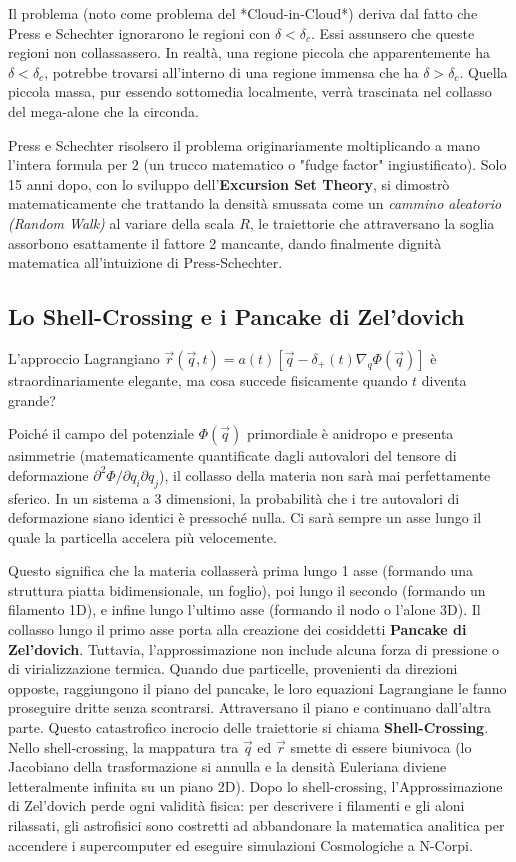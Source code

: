 \documentclass[11pt,a4paper]{report}
\begin{document}
Il problema (noto come problema del *Cloud-in-Cloud*) deriva dal fatto che Press e Schechter ignorarono le regioni con $\delta < \delta_c$. Essi assunsero che queste regioni non collassassero. In realtà, una regione piccola che apparentemente ha $\delta < \delta_c$, potrebbe trovarsi all'interno di una regione immensa che ha $\delta > \delta_c$. Quella piccola massa, pur essendo sottomedia localmente, verrà trascinata nel collasso del mega-alone che la circonda. 

Press e Schechter risolsero il problema originariamente moltiplicando a mano l'intera formula per $2$ (un trucco matematico o "fudge factor" ingiustificato). Solo 15 anni dopo, con lo sviluppo dell'\textbf{Excursion Set Theory}, si dimostrò matematicamente che trattando la densità smussata come un \textit{cammino aleatorio (Random Walk)} al variare della scala $R$, le traiettorie che attraversano la soglia assorbono esattamente il fattore 2 mancante, dando finalmente dignità matematica all'intuizione di Press-Schechter.

\subsection{Lo Shell-Crossing e i Pancake di Zel'dovich}
L'approccio Lagrangiano $\vec{r}(\vec{q}, t) = a(t) [ \vec{q} - \delta_+(t) \nabla_q \Phi(\vec{q}) ]$ è straordinariamente elegante, ma cosa succede fisicamente quando $t$ diventa grande?

Poiché il campo del potenziale $\Phi(\vec{q})$ primordiale è anidropo e presenta asimmetrie (matematicamente quantificate dagli autovalori del tensore di deformazione $\partial^2 \Phi / \partial q_i \partial q_j$), il collasso della materia non sarà mai perfettamente sferico. 
In un sistema a 3 dimensioni, la probabilità che i tre autovalori di deformazione siano identici è pressoché nulla. Ci sarà sempre un asse lungo il quale la particella accelera più velocemente.

Questo significa che la materia collasserà prima lungo 1 asse (formando una struttura piatta bidimensionale, un foglio), poi lungo il secondo (formando un filamento 1D), e infine lungo l'ultimo asse (formando il nodo o l'alone 3D).
Il collasso lungo il primo asse porta alla creazione dei cosiddetti \textbf{Pancake di Zel'dovich}. 
Tuttavia, l'approssimazione non include alcuna forza di pressione o di virializzazione termica. Quando due particelle, provenienti da direzioni opposte, raggiungono il piano del pancake, le loro equazioni Lagrangiane le fanno proseguire dritte senza scontrarsi. Attraversano il piano e continuano dall'altra parte. Questo catastrofico incrocio delle traiettorie si chiama \textbf{Shell-Crossing}.
Nello shell-crossing, la mappatura tra $\vec{q}$ ed $\vec{r}$ smette di essere biunivoca (lo Jacobiano della trasformazione si annulla e la densità Euleriana diviene letteralmente infinita su un piano 2D). Dopo lo shell-crossing, l'Approssimazione di Zel'dovich perde ogni validità fisica: per descrivere i filamenti e gli aloni rilassati, gli astrofisici sono costretti ad abbandonare la matematica analitica per accendere i supercomputer ed eseguire simulazioni Cosmologiche a N-Corpi.
\end{document}
